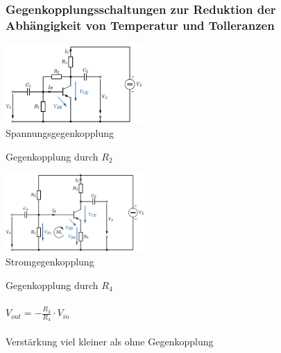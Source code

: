   \subsubsection{Gegenkopplungsschaltungen zur Reduktion der Abh\"angigkeit von Temperatur und Tolleranzen}
    \begin{minipage}[T]{5.4cm}
      \includegraphics[height=3cm]{./bilder/Spannungsgegenkopplung.png}\\
      Spannungsgegenkopplung
    \end{minipage}
    \begin{minipage}[T]{4cm}
      Gegenkopplung durch $R_2$
    \end{minipage}
    \vrule \hspace{0.1cm}
    \begin{minipage}[T]{5.5cm}
      \includegraphics[height=3cm]{./bilder/Stromgegenkopplung.png} \\
      Stromgegenkopplung
    \end{minipage}
    \begin{minipage}[T]{4cm}
      Gegenkopplung durch $R_4$\\\\
      $V_{out} = -\frac{R_3}{R_4}\cdot V_{in}$\\\\
      Verst\"arkung viel kleiner als ohne Gegenkopplung
    \end{minipage}
            
